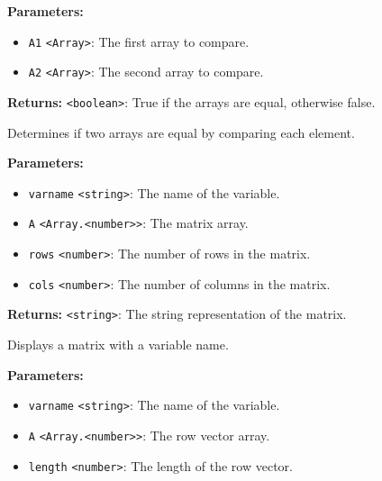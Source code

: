 \documentclass[12pt,a4paper]{article}
\begin{document}
\vspace{5mm}
\noindent {}


\noindent \textbf{Parameters:}
\begin{itemize}
  \item \texttt{A1} \texttt{<Array>}: The first array to compare.
  \item \texttt{A2} \texttt{<Array>}: The second array to compare.
\end{itemize}

\noindent \textbf{Returns:} \texttt{<boolean>}: True if the arrays are equal, otherwise false.

\noindent Determines if two arrays are equal by comparing each element.

\vspace{5mm}
\noindent {}


\noindent \textbf{Parameters:}
\begin{itemize}
  \item \texttt{varname} \texttt{<string>}: The name of the variable.
  \item \texttt{A} \texttt{<Array.<number>>}: The matrix array.
  \item \texttt{rows} \texttt{<number>}: The number of rows in the matrix.
  \item \texttt{cols} \texttt{<number>}: The number of columns in the matrix.
\end{itemize}

\noindent \textbf{Returns:} \texttt{<string>}: The string representation of the matrix.

\noindent Displays a matrix with a variable name.

\vspace{5mm}
\noindent {}


\noindent \textbf{Parameters:}
\begin{itemize}
  \item \texttt{varname} \texttt{<string>}: The name of the variable.
  \item \texttt{A} \texttt{<Array.<number>>}: The row vector array.
  \item \texttt{length} \texttt{<number>}: The length of the row vector.
\end{itemize}
\end{document}
